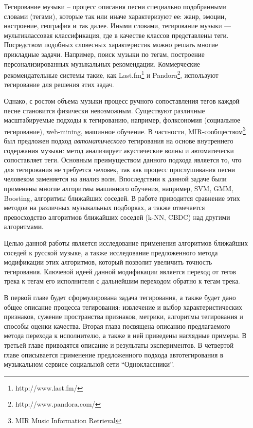 \startprefacepage	

Тегирование музыки -- процесс описания песни специально подобранными словами (тегами), которые так или иначе характеризуют ее: жанр, эмоции, настроение, география и так далее.
Иными словами, тегирование музыки {{---}} мультиклассовая классификация, где в качестве классов представлены теги.
Посредством подобных словесных характеристик можно решать многие прикладные задачи. Например, поиск музыки по тегам, построение персонализированных музыкальных рекомендации.
Коммерческие рекомендательные системы такие, как Last.fm\footnote{http://www.last.fm/} и Pandora\footnote{http://www.pandora.com/}, используют тегирование для решения этих задач. 

Однако, с ростом объема музыки процесс ручного сопоставления 
тегов каждой песне становится физически невозможным. Существуют различные масштабируемые подходы к тегированию, например, фолксономия (социальное тегирование), web-mining, машинное обучение. 
В частности, MIR-сообществом\footnote{MIR \ld Music Information Retrieval} был предложен подход \emph{автоматического} тегирования на основе внутреннего содержания музыки: 
метод анализирует акустические волны и автоматически сопоставляет теги. 
Основным преимуществом данного подхода является то, что для тегирования не требуется человек, так как процесс прослушивания песни человеком заменяется на анализ волн.
Впоследствии к данной задаче были применены многие алгоритмы машинного обучения, например, SVM, GMM, Boosting, алгоритмы ближайших соседей. 
В работе \cite{msordo_thesis} приводится сравнение этих методов на различных музыкальных подборках, а также отмечается превосходство алгоритмов ближайших соседей (k-NN, CBDC) над другими алгоритмами.

Целью данной работы является исследование применения алгоритмов ближайших соседей к русской музыке, а также исследование предложенного метода модификации этих алгоритмов, который
позволит увеличить точность тегирования.
Ключевой идеей данной модификации является переход от тегов трека к тегам его исполнителя с дальнейшим переходом обратно к тегам трека.

В первой главе будет сформулирована задача тегирования, а также будет дано общее описание процесса тегирования: извлечение и выбор характеристических признаков,
сужение пространства признаков, метрики, алгоритмы тегирования и способы оценки качества.
Вторая глава посвящена описанию предлагаемого метода перехода к исполнителю, а также в ней приведены наглядные примеры.
В третьей главе приводятся описание и результаты экспериментов. В четвертой главе описывается применение предложенного подхода автотегирования в музыкальном сервисе
социальной сети ``Одноклассники''.